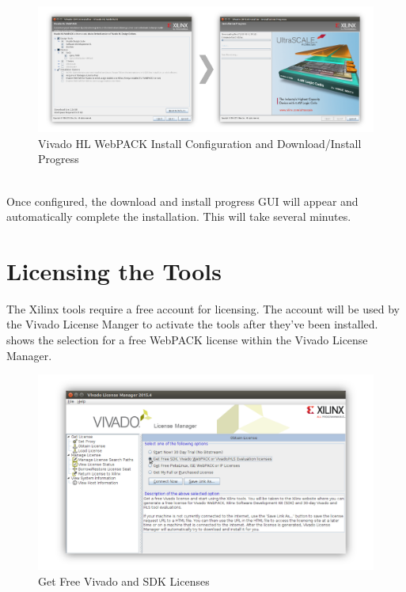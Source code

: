 \begin{figure}[h!]
	\centering
	\includegraphics{images/Vivado_Installer_Webpack.png}
	\caption{Vivado HL WebPACK Install Configuration and Download/Install Progress}
	\label{fig:webpackconfig}
\end{figure}

~\\
\noindent
Once configured, the download and install progress GUI will appear and automatically complete the installation. This will take several minutes.


\section{Licensing the Tools}

The Xilinx tools require a free account for licensing. The account will be used by the Vivado License Manger to activate the tools after they've been installed.  shows the selection for a free WebPACK license within the Vivado License Manager. 

\begin{figure}
	\centering
	\includegraphics{images/Vivado_License_Manager.png}
	\caption{Get Free Vivado and SDK Licenses}
	\label{fig:vivadolicense}
\end{figure}


